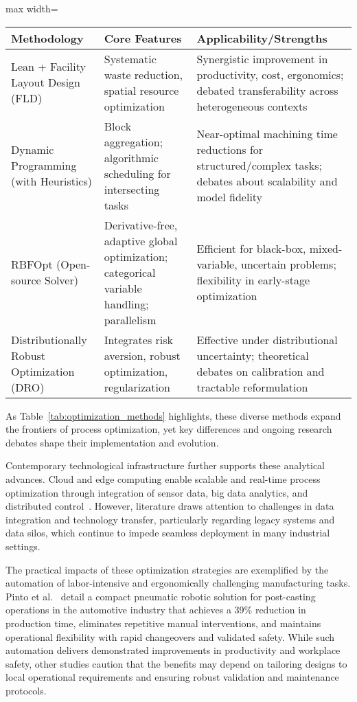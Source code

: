 \documentclass[sigconf]{acmart}
\begin{document}
\begin{table*}[htbp]
  \centering
  \caption{Summary of Selected Optimization Approaches and Their Core Features}
  \label{tab:optimization_methods}
  \begin{adjustbox}{max width=\textwidth}
  \begin{tabular}{lll}
  \toprule
  \textbf{Methodology} & \textbf{Core Features} & \textbf{Applicability/Strengths} \\
  \midrule
  Lean + Facility Layout Design (FLD) & Systematic waste reduction, spatial resource optimization & Synergistic improvement in productivity, cost, ergonomics; debated transferability across heterogeneous contexts \\
  Dynamic Programming (with Heuristics) & Block aggregation; algorithmic scheduling for intersecting tasks & Near-optimal machining time reductions for structured/complex tasks; debates about scalability and model fidelity \\
  RBFOpt (Open-source Solver) & Derivative-free, adaptive global optimization; categorical variable handling; parallelism & Efficient for black-box, mixed-variable, uncertain problems; flexibility in early-stage optimization \\
  Distributionally Robust Optimization (DRO) & Integrates risk aversion, robust optimization, regularization & Effective under distributional uncertainty; theoretical debates on calibration and tractable reformulation \\
  \bottomrule
  \end{tabular}
  \end{adjustbox}
\end{table*}

As Table~\ref{tab:optimization_methods} highlights, these diverse methods expand the frontiers of process optimization, yet key differences and ongoing research debates shape their implementation and evolution.

Contemporary technological infrastructure further supports these analytical advances. Cloud and edge computing enable scalable and real-time process optimization through integration of sensor data, big data analytics, and distributed control~\cite{ref80}. However, literature draws attention to challenges in data integration and technology transfer, particularly regarding legacy systems and data silos, which continue to impede seamless deployment in many industrial settings.

The practical impacts of these optimization strategies are exemplified by the automation of labor-intensive and ergonomically challenging manufacturing tasks. Pinto et al.~\cite{ref62} detail a compact pneumatic robotic solution for post-casting operations in the automotive industry that achieves a 39\% reduction in production time, eliminates repetitive manual interventions, and maintains operational flexibility with rapid changeovers and validated safety. While such automation delivers demonstrated improvements in productivity and workplace safety, other studies caution that the benefits may depend on tailoring designs to local operational requirements and ensuring robust validation and maintenance protocols.
\end{document}
